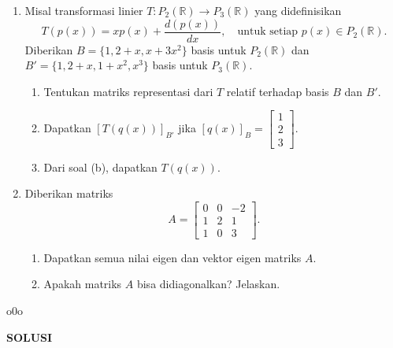 \documentclass[11pt,letterpaper]{article}
\begin{document}
\begin{enumerate}
  \item Misal transformasi linier $T : P_2(\mathbb{R}) \to P_3(\mathbb{R})$ yang didefinisikan
        \[
          T(p(x)) = x p(x) + \frac{d(p(x))}{dx}, \quad \text{untuk setiap } p(x) \in P_2(\mathbb{R}).
        \]
        Diberikan $B = \{1, 2+x, x+3x^2\}$ basis untuk $P_2(\mathbb{R})$ dan $B' = \{1, 2+x, 1+x^2, x^3\}$ basis untuk $P_3(\mathbb{R})$.
        \begin{enumerate}
          \item Tentukan matriks representasi dari $T$ relatif terhadap basis $B$ dan $B'$.
          \item Dapatkan $[T(q(x))]_{B'}$ jika $[q(x)]_B =
                  \begin{bmatrix}
                    1 \\ 2 \\ 3
                  \end{bmatrix}$.
          \item Dari soal (b), dapatkan $T(q(x))$.
        \end{enumerate}
  \item Diberikan matriks
        \[
          A = \begin{bmatrix}
            0 & 0 & -2 \\
            1 & 2 & 1  \\
            1 & 0 & 3
          \end{bmatrix}.
        \]
        \begin{enumerate}
          \item Dapatkan semua nilai eigen dan vektor eigen matriks $A$.
          \item Apakah matriks $A$ bisa didiagonalkan? Jelaskan.
        \end{enumerate}

\end{enumerate}
\vspace*{0.05mm}
\begin{center}
  \raisebox{.5ex}{\rule{0.5cm}{.4pt}}o0o\raisebox{.5ex}{\rule{0.5cm}{.4pt}}
\end{center}
\newpage
\begin{center}
  \textbf{SOLUSI}
\end{center}
\end{document}
